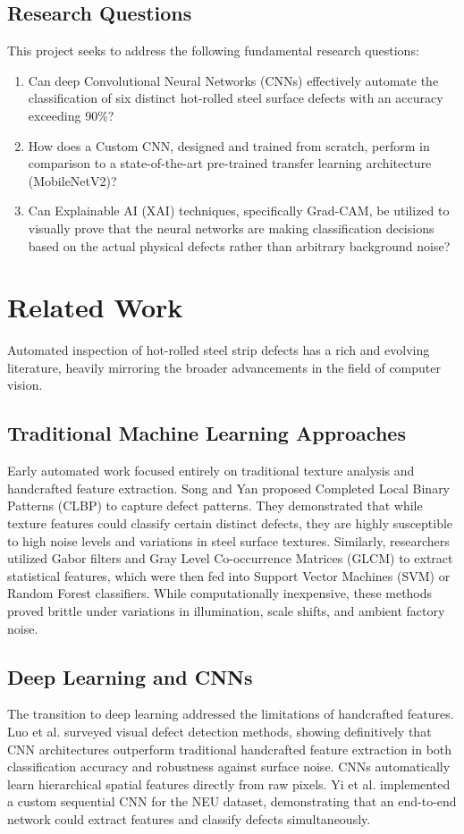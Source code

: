 \documentclass[conference, a4paper]{IEEEtran}
\begin{document}
\subsection{Research Questions}
This project seeks to address the following fundamental research questions:
\begin{enumerate}
    \item Can deep Convolutional Neural Networks (CNNs) effectively automate the classification of six distinct hot-rolled steel surface defects with an accuracy exceeding 90\%?
    \item How does a Custom CNN, designed and trained from scratch, perform in comparison to a state-of-the-art pre-trained transfer learning architecture (MobileNetV2)?
    \item Can Explainable AI (XAI) techniques, specifically Grad-CAM, be utilized to visually prove that the neural networks are making classification decisions based on the actual physical defects rather than arbitrary background noise?
\end{enumerate}

\section{Related Work}
Automated inspection of hot-rolled steel strip defects has a rich and evolving literature, heavily mirroring the broader advancements in the field of computer vision.

\subsection{Traditional Machine Learning Approaches}
Early automated work focused entirely on traditional texture analysis and handcrafted feature extraction. Song and Yan \cite{song2013noise} proposed Completed Local Binary Patterns (CLBP) to capture defect patterns. They demonstrated that while texture features could classify certain distinct defects, they are highly susceptible to high noise levels and variations in steel surface textures. Similarly, researchers utilized Gabor filters and Gray Level Co-occurrence Matrices (GLCM) to extract statistical features, which were then fed into Support Vector Machines (SVM) or Random Forest classifiers. While computationally inexpensive, these methods proved brittle under variations in illumination, scale shifts, and ambient factory noise.

\subsection{Deep Learning and CNNs}
The transition to deep learning addressed the limitations of handcrafted features. Luo et al. \cite{luo2020automated} surveyed visual defect detection methods, showing definitively that CNN architectures outperform traditional handcrafted feature extraction in both classification accuracy and robustness against surface noise. CNNs automatically learn hierarchical spatial features directly from raw pixels. Yi et al. \cite{yi2017end} implemented a custom sequential CNN for the NEU dataset, demonstrating that an end-to-end network could extract features and classify defects simultaneously.
\end{document}
